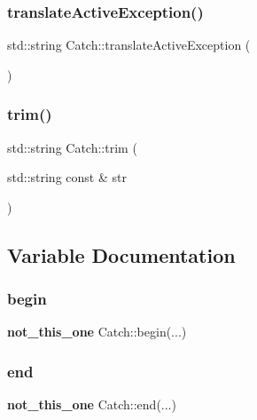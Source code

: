 \mbox{\label{namespace_catch_adafff91485eeeeb9e9333f317cc0e3b1}} 
\subsubsection{translateActiveException()}
{\footnotesize\ttfamily std\+::string Catch\+::translate\+Active\+Exception (\begin{DoxyParamCaption}{ }\end{DoxyParamCaption})}

\mbox{\label{namespace_catch_a084108b47f37d8bfd5db51c50c7451b3}} 
\subsubsection{trim()}
{\footnotesize\ttfamily std\+::string Catch\+::trim (\begin{DoxyParamCaption}\item[{std\+::string const \&}]{str }\end{DoxyParamCaption})}



\subsection{Variable Documentation}
\mbox{\label{namespace_catch_ac7ccff5c186bffa3b448b218ecf15956}} 
\subsubsection{begin}
{\footnotesize\ttfamily \textbf{ not\+\_\+this\+\_\+one} Catch\+::begin(...)}

\mbox{\label{namespace_catch_a71fef6a57614eb2d9751f8586ff6de6a}} 
\subsubsection{end}
{\footnotesize\ttfamily \textbf{ not\+\_\+this\+\_\+one} Catch\+::end(...)}

